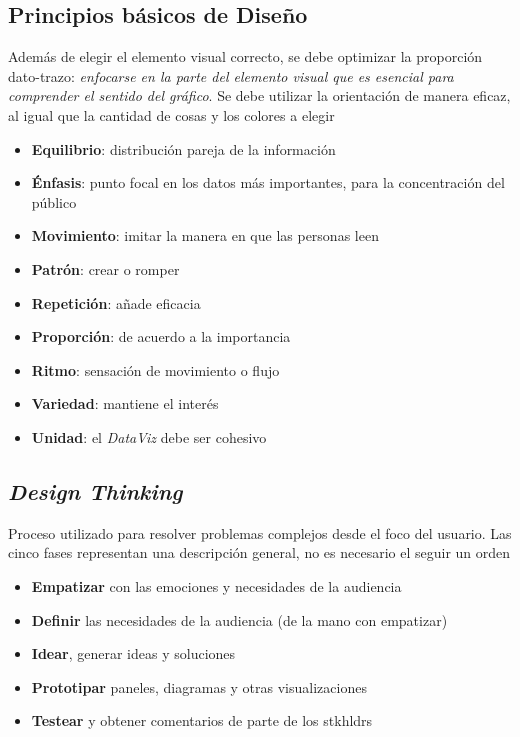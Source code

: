 \subsection{Principios básicos de Diseño}
Además de elegir el elemento visual correcto, se debe optimizar la proporción dato-trazo: \textit{enfocarse en la parte del elemento visual que es esencial para comprender el sentido del gráfico}. Se debe utilizar la orientación de manera eficaz, al igual que la cantidad de cosas y los colores a elegir
\begin{itemize}
    \item {\textbf{Equilibrio}: distribución pareja de la información}
    \item {\textbf{Énfasis}: punto focal en los datos más importantes, para la concentración del público}
    \item {\textbf{Movimiento}: imitar la manera en que las personas leen}
    \item {\textbf{Patrón}: crear o romper}
    \item {\textbf{Repetición}: añade eficacia}
    \item {\textbf{Proporción}: de acuerdo a la importancia}
    \item {\textbf{Ritmo}: sensación de movimiento o flujo}
    \item {\textbf{Variedad}: mantiene el interés}
    \item {\textbf{Unidad}: el \textit{DataViz} debe ser cohesivo}
\end{itemize}

\subsection{\textit{Design Thinking}}
Proceso utilizado para resolver problemas complejos desde el foco del usuario. Las cinco fases representan una descripción general, no es necesario el seguir un orden
\begin{itemize}
    \item {\textbf{Empatizar} con las emociones y necesidades de la audiencia}
    \item {\textbf{Definir} las necesidades de la audiencia (de la mano con empatizar)}
    \item {\textbf{Idear}, generar ideas y soluciones} 
    \item {\textbf{Prototipar} paneles, diagramas y otras visualizaciones}
    \item {\textbf{Testear} y obtener comentarios de parte de los \gls{stkhldrs}}
\end{itemize}

